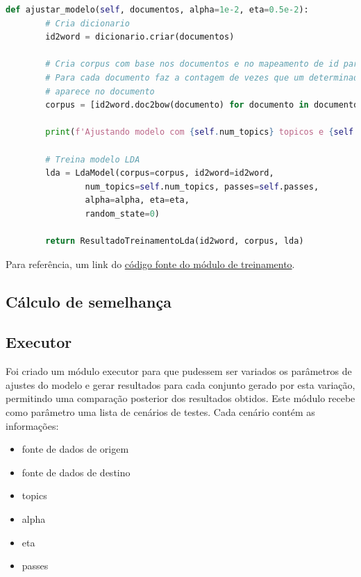 \begin{lstlisting}[language=Python, style=mystyle, frame=lines, caption=Código fonte: Treinamento de modelo usando LDA]
    def ajustar_modelo(self, documentos, alpha=1e-2, eta=0.5e-2):
        # Cria dicionario
        id2word = dicionario.criar(documentos)

        # Cria corpus com base nos documentos e no mapeamento de id para palavra
        # Para cada documento faz a contagem de vezes que um determinado topico
        # aparece no documento
        corpus = [id2word.doc2bow(documento) for documento in documentos]

        print(f'Ajustando modelo com {self.num_topics} topicos e {self.passes} passes')

        # Treina modelo LDA        
        lda = LdaModel(corpus=corpus, id2word=id2word, 
                num_topics=self.num_topics, passes=self.passes, 
                alpha=alpha, eta=eta,
                random_state=0)

        return ResultadoTreinamentoLda(id2word, corpus, lda)
\end{lstlisting}

Para referência, um link do \href{https://github.com/heldergr/tcc-pucmg-2/blob/main/src/python/notebooks/treinamento/treinamento_lda.py}{código fonte do módulo de treinamento}.

\subsection{Cálculo de semelhança}

\subsection{Executor}

Foi criado um módulo executor para que pudessem ser variados os parâmetros de ajustes do modelo e gerar resultados para cada conjunto gerado por esta variação, permitindo uma comparação posterior dos resultados obtidos.
Este módulo recebe como parâmetro uma lista de cenários de testes. Cada cenário contém as informações:
\begin{itemize}
    \item fonte de dados de origem
    \item fonte de dados de destino
    \item topics
    \item alpha
    \item eta
    \item passes
\end{itemize}

